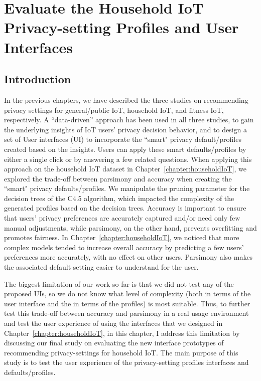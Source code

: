 \chapter{Evaluate the Household IoT Privacy-setting Profiles and User Interfaces}\label{chapter:evaluation}

\section{Introduction}

In the previous chapters, we have described the three studies on recommending privacy settings for general/public IoT, household IoT, and fitness IoT, respectively. A ``data-driven” approach has been used in all three studies, to gain the underlying insights of IoT users' privacy decision behavior, and to design a set of User interfaces (UI) to incorporate the ``smart" privacy default/profiles created based on the insights. Users can apply these smart defaults/profiles by either a single click or by answering a few related questions. When applying this approach on the household IoT dataset in Chapter~\ref{chapter:householdIoT}, we explored the trade-off between parsimony and accuracy when creating the ``smart" privacy defaults/profiles. We manipulate the pruning parameter for the decision trees of the C4.5 algorithm, which impacted the complexity of the generated profiles based on the decision trees. Accuracy is important to ensure that users' privacy preferences are accurately captured and/or need only few manual adjustments, while parsimony, on the other hand, prevents overfitting and promotes fairness. In Chapter~\ref{chapter:householdIoT}, we noticed that more complex models tended to increase overall accuracy by predicting a few users' preferences more accurately, with no effect on other users. Parsimony also makes the associated default setting easier to understand for the user. 

The biggest limitation of our work so far is that we did not test any of the proposed UIs, so we do not know what level of complexity (both in terms of the user interface and the in terms of the profiles) is most suitable. Thus, to further test this trade-off between accuracy and parsimony in a real usage environment and test the user experience of using the interfaces that we designed in Chapter~\ref{chapter:householdIoT}, in this chapter, I address this limitation by discussing our final study on evaluating the new interface prototypes of recommending privacy-settings for household IoT. The main purpose of this study is to test the user experience of the privacy-setting profiles interfaces and defaults/profiles.


